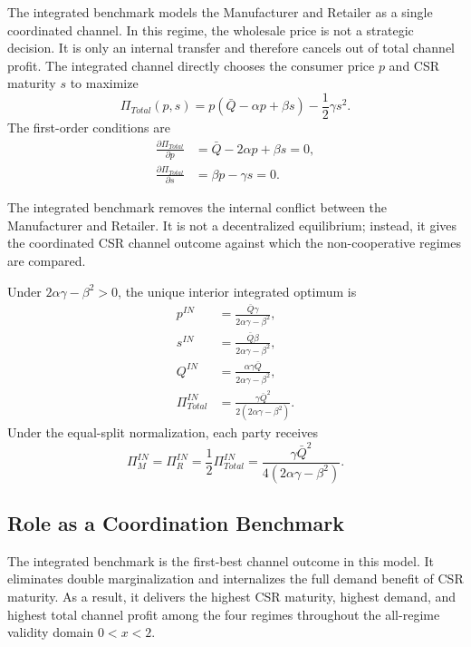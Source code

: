 The integrated benchmark models the Manufacturer and Retailer as a single coordinated channel. In this regime, the wholesale price is not a strategic decision. It is only an internal transfer and therefore cancels out of total channel profit. The integrated channel directly chooses the consumer price $p$ and CSR maturity $s$ to maximize
\begin{equation*}
    \Pi_{Total}(p,s)=p(\bar{Q}-\alpha p+\beta s)-\frac12\gamma s^2.
\end{equation*}
The first-order conditions are
\begin{align*}
    \frac{\partial \Pi_{Total}}{\partial p}&=\bar{Q}-2\alpha p+\beta s=0,\\
    \frac{\partial \Pi_{Total}}{\partial s}&=\beta p-\gamma s=0.
\end{align*}

The integrated benchmark removes the internal conflict between the Manufacturer and Retailer. It is not a decentralized equilibrium; instead, it gives the coordinated CSR channel outcome against which the non-cooperative regimes are compared.

\begin{proposition}
\label{prop:in}
Under $2\alpha\gamma-\beta^2>0$, the unique interior integrated optimum is
\begin{align*}
    p^{IN} &= \frac{\bar{Q}\gamma}{2\alpha\gamma-\beta^2},\\
    s^{IN} &= \frac{\bar{Q}\beta}{2\alpha\gamma-\beta^2},\\
    Q^{IN} &= \frac{\alpha\gamma\bar{Q}}{2\alpha\gamma-\beta^2},\\
    \Pi_{Total}^{IN} &= \frac{\gamma\bar{Q}^2}{2(2\alpha\gamma-\beta^2)}.
\end{align*}
Under the equal-split normalization, each party receives
\begin{equation}
    \Pi_M^{IN}=\Pi_R^{IN}=\frac12\Pi_{Total}^{IN}
    =\frac{\gamma\bar{Q}^2}{4(2\alpha\gamma-\beta^2)}.
    \label{eq:pi_in_split}
\end{equation}
\end{proposition}

\subsection{Role as a Coordination Benchmark}

The integrated benchmark is the first-best channel outcome in this model. It eliminates double marginalization and internalizes the full demand benefit of CSR maturity. As a result, it delivers the highest CSR maturity, highest demand, and highest total channel profit among the four regimes throughout the all-regime validity domain $0<x<2$.

